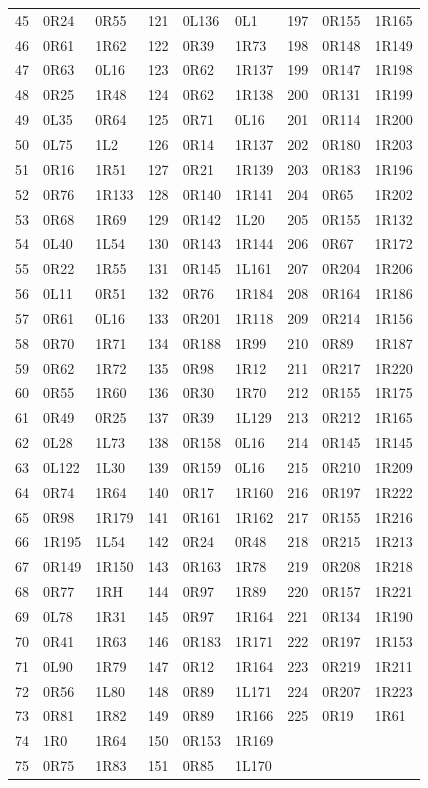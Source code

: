 \begin{longtable}{@{}rll@{\hspace{7mm}}rll@{\hspace{7mm}}rll@{}}
45 & 0R24 & 0R55 & 121 & 0L136 & 0L1 & 197 & 0R155 & 1R165\\
46 & 0R61 & 1R62 & 122 & 0R39 & 1R73 & 198 & 0R148 & 1R149\\
47 & 0R63 & 0L16 & 123 & 0R62 & 1R137 & 199 & 0R147 & 1R198\\
48 & 0R25 & 1R48 & 124 & 0R62 & 1R138 & 200 & 0R131 & 1R199\\
49 & 0L35 & 0R64 & 125 & 0R71 & 0L16 & 201 & 0R114 & 1R200\\
50 & 0L75 & 1L2 & 126 & 0R14 & 1R137 & 202 & 0R180 & 1R203\\
51 & 0R16 & 1R51 & 127 & 0R21 & 1R139 & 203 & 0R183 & 1R196\\
52 & 0R76 & 1R133 & 128 & 0R140 & 1R141 & 204 & 0R65 & 1R202\\
53 & 0R68 & 1R69 & 129 & 0R142 & 1L20 & 205 & 0R155 & 1R132\\
54 & 0L40 & 1L54 & 130 & 0R143 & 1R144 & 206 & 0R67 & 1R172\\
55 & 0R22 & 1R55 & 131 & 0R145 & 1L161 & 207 & 0R204 & 1R206\\
56 & 0L11 & 0R51 & 132 & 0R76 & 1R184 & 208 & 0R164 & 1R186\\
57 & 0R61 & 0L16 & 133 & 0R201 & 1R118 & 209 & 0R214 & 1R156\\
58 & 0R70 & 1R71 & 134 & 0R188 & 1R99 & 210 & 0R89 & 1R187\\
59 & 0R62 & 1R72 & 135 & 0R98 & 1R12 & 211 & 0R217 & 1R220\\
60 & 0R55 & 1R60 & 136 & 0R30 & 1R70 & 212 & 0R155 & 1R175\\
61 & 0R49 & 0R25 & 137 & 0R39 & 1L129 & 213 & 0R212 & 1R165\\
62 & 0L28 & 1L73 & 138 & 0R158 & 0L16 & 214 & 0R145 & 1R145\\
63 & 0L122 & 1L30 & 139 & 0R159 & 0L16 & 215 & 0R210 & 1R209\\
64 & 0R74 & 1R64 & 140 & 0R17 & 1R160 & 216 & 0R197 & 1R222\\
65 & 0R98 & 1R179 & 141 & 0R161 & 1R162 & 217 & 0R155 & 1R216\\
66 & 1R195 & 1L54 & 142 & 0R24 & 0R48 & 218 & 0R215 & 1R213\\
67 & 0R149 & 1R150 & 143 & 0R163 & 1R78 & 219 & 0R208 & 1R218\\
68 & 0R77 & 1RH & 144 & 0R97 & 1R89 & 220 & 0R157 & 1R221\\
69 & 0L78 & 1R31 & 145 & 0R97 & 1R164 & 221 & 0R134 & 1R190\\
70 & 0R41 & 1R63 & 146 & 0R183 & 1R171 & 222 & 0R197 & 1R153\\
71 & 0L90 & 1R79 & 147 & 0R12 & 1R164 & 223 & 0R219 & 1R211\\
72 & 0R56 & 1L80 & 148 & 0R89 & 1L171 & 224 & 0R207 & 1R223\\
73 & 0R81 & 1R82 & 149 & 0R89 & 1R166 & 225 & 0R19 & 1R61\\
74 & 1R0 & 1R64 & 150 & 0R153 & 1R169 &  &  & \\
75 & 0R75 & 1R83 & 151 & 0R85 & 1L170 &  &  & \\
\end{longtable}
\endgroup
